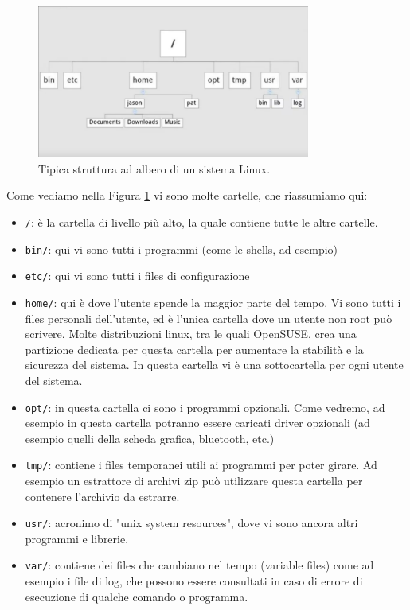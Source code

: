 \documentclass[11pt]{book}
\begin{document}
\begin{figure}
	\centering
	\includegraphics[width=0.8\textwidth]{img/filesystem_tree.png}
	\caption{Tipica struttura ad albero di un sistema Linux.}
	\label{fs_tree}
\end{figure}

Come vediamo nella Figura \ref{fs_tree} vi sono molte cartelle, che riassumiamo qui:
\begin{itemize}
	\item \verb"/": è la cartella di livello più alto, la quale contiene tutte le altre cartelle.
	\item \verb"bin/": qui vi sono tutti i programmi (come le shells, ad esempio)
	\item \verb"etc/": qui vi sono tutti i files di configurazione 
	\item \verb"home/": qui è dove l'utente spende la maggior parte del tempo. Vi sono tutti i files personali dell'utente, ed è l'unica cartella dove un utente non root può scrivere. Molte distribuzioni linux, tra le quali OpenSUSE, crea una partizione dedicata per questa cartella per aumentare la stabilità e la sicurezza del sistema. In questa cartella vi è una sottocartella per ogni utente del sistema.
	\item \verb"opt/": in questa cartella ci sono i programmi opzionali. Come vedremo, ad esempio in questa cartella potranno essere caricati driver opzionali (ad esempio quelli della scheda grafica, bluetooth, etc.) 
	\item \verb"tmp/": contiene i files temporanei utili ai programmi per poter girare. Ad esempio un estrattore di archivi zip può utilizzare questa cartella per contenere l'archivio da estrarre. 
	\item \verb"usr/": acronimo di "unix system resources", dove vi sono ancora altri programmi e librerie.
	\item \verb"var/": contiene dei files che cambiano nel tempo (variable files) come ad esempio i file di log, che possono essere consultati in caso di errore di esecuzione di qualche comando o programma.
\end{itemize}
\end{document}
